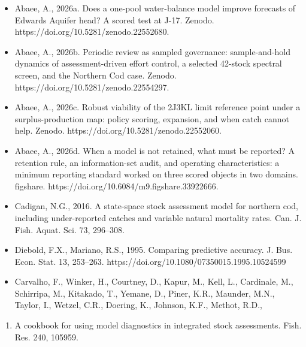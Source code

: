 \documentclass[11pt]{article}
\providecommand{\tightlist}{\setlength{\itemsep}{0.2em}\setlength{\parskip}{0pt}}
\begin{document}
\begin{itemize}
\item
  Abaee, A., 2026a. Does a one-pool water-balance model improve
  forecasts of Edwards Aquifer head? A scored test at J-17. Zenodo.
  https://doi.org/10.5281/zenodo.22552680.
\item
  Abaee, A., 2026b. Periodic review as sampled governance:
  sample-and-hold dynamics of assessment-driven effort control, a
  selected 42-stock spectral screen, and the Northern Cod case. Zenodo.
  https://doi.org/10.5281/zenodo.22554297.
\item
  Abaee, A., 2026c. Robust viability of the 2J3KL limit reference point
  under a surplus-production map: policy scoring, expansion, and when
  catch cannot help. Zenodo. https://doi.org/10.5281/zenodo.22552060.
\item
  Abaee, A., 2026d. When a model is not retained, what must be reported?
  A retention rule, an information-set audit, and operating
  characteristics: a minimum reporting standard worked on three scored
  objects in two domains. figshare.
  https://doi.org/10.6084/m9.figshare.33922666.
\item
  Cadigan, N.G., 2016. A state-space stock assessment model for northern
  cod, including under-reported catches and variable natural mortality
  rates. Can. J. Fish. Aquat. Sci. 73, 296--308.
\item
  Diebold, F.X., Mariano, R.S., 1995. Comparing predictive accuracy. J.
  Bus. Econ. Stat. 13, 253--263.
  https://doi.org/10.1080/07350015.1995.10524599
\item
  Carvalho, F., Winker, H., Courtney, D., Kapur, M., Kell, L.,
  Cardinale, M., Schirripa, M., Kitakado, T., Yemane, D., Piner, K.R.,
  Maunder, M.N., Taylor, I., Wetzel, C.R., Doering, K., Johnson, K.F.,
  Methot, R.D.,
\end{itemize}

\begin{enumerate}
\def\labelenumi{\arabic{enumi}.}
\setcounter{enumi}{2020}
\tightlist
\item
  A cookbook for using model diagnostics in integrated stock
  assessments. Fish. Res. 240, 105959.
\end{enumerate}
\end{document}

